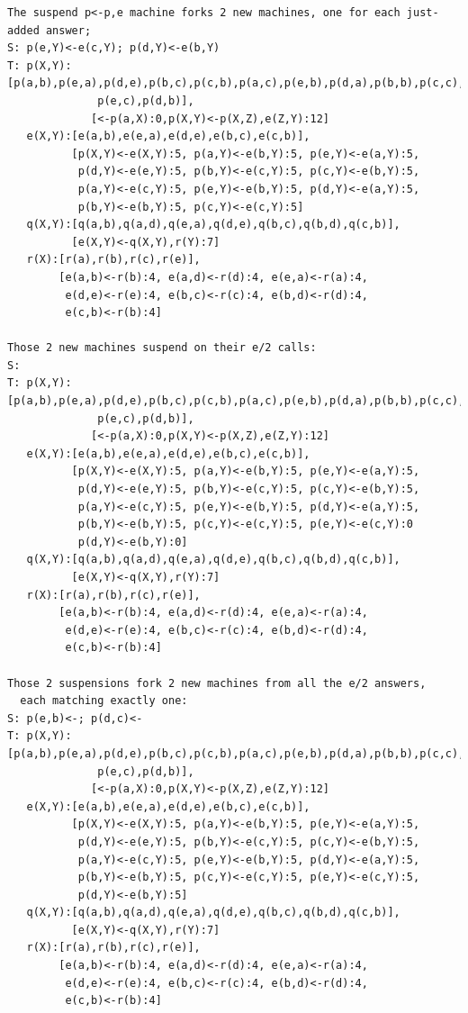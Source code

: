 \begin{verbatim}
The suspend p<-p,e machine forks 2 new machines, one for each just-added answer;
S: p(e,Y)<-e(c,Y); p(d,Y)<-e(b,Y)
T: p(X,Y):[p(a,b),p(e,a),p(d,e),p(b,c),p(c,b),p(a,c),p(e,b),p(d,a),p(b,b),p(c,c),
              p(e,c),p(d,b)],
             [<-p(a,X):0,p(X,Y)<-p(X,Z),e(Z,Y):12]
   e(X,Y):[e(a,b),e(e,a),e(d,e),e(b,c),e(c,b)],
          [p(X,Y)<-e(X,Y):5, p(a,Y)<-e(b,Y):5, p(e,Y)<-e(a,Y):5,
           p(d,Y)<-e(e,Y):5, p(b,Y)<-e(c,Y):5, p(c,Y)<-e(b,Y):5,
           p(a,Y)<-e(c,Y):5, p(e,Y)<-e(b,Y):5, p(d,Y)<-e(a,Y):5,
           p(b,Y)<-e(b,Y):5, p(c,Y)<-e(c,Y):5]
   q(X,Y):[q(a,b),q(a,d),q(e,a),q(d,e),q(b,c),q(b,d),q(c,b)],
          [e(X,Y)<-q(X,Y),r(Y):7]
   r(X):[r(a),r(b),r(c),r(e)],
        [e(a,b)<-r(b):4, e(a,d)<-r(d):4, e(e,a)<-r(a):4,
         e(d,e)<-r(e):4, e(b,c)<-r(c):4, e(b,d)<-r(d):4,
         e(c,b)<-r(b):4]

Those 2 new machines suspend on their e/2 calls:
S: 
T: p(X,Y):[p(a,b),p(e,a),p(d,e),p(b,c),p(c,b),p(a,c),p(e,b),p(d,a),p(b,b),p(c,c),
              p(e,c),p(d,b)],
             [<-p(a,X):0,p(X,Y)<-p(X,Z),e(Z,Y):12]
   e(X,Y):[e(a,b),e(e,a),e(d,e),e(b,c),e(c,b)],
          [p(X,Y)<-e(X,Y):5, p(a,Y)<-e(b,Y):5, p(e,Y)<-e(a,Y):5,
           p(d,Y)<-e(e,Y):5, p(b,Y)<-e(c,Y):5, p(c,Y)<-e(b,Y):5,
           p(a,Y)<-e(c,Y):5, p(e,Y)<-e(b,Y):5, p(d,Y)<-e(a,Y):5,
           p(b,Y)<-e(b,Y):5, p(c,Y)<-e(c,Y):5, p(e,Y)<-e(c,Y):0
           p(d,Y)<-e(b,Y):0]
   q(X,Y):[q(a,b),q(a,d),q(e,a),q(d,e),q(b,c),q(b,d),q(c,b)],
          [e(X,Y)<-q(X,Y),r(Y):7]
   r(X):[r(a),r(b),r(c),r(e)],
        [e(a,b)<-r(b):4, e(a,d)<-r(d):4, e(e,a)<-r(a):4,
         e(d,e)<-r(e):4, e(b,c)<-r(c):4, e(b,d)<-r(d):4,
         e(c,b)<-r(b):4]

Those 2 suspensions fork 2 new machines from all the e/2 answers,
  each matching exactly one:
S: p(e,b)<-; p(d,c)<-
T: p(X,Y):[p(a,b),p(e,a),p(d,e),p(b,c),p(c,b),p(a,c),p(e,b),p(d,a),p(b,b),p(c,c),
              p(e,c),p(d,b)],
             [<-p(a,X):0,p(X,Y)<-p(X,Z),e(Z,Y):12]
   e(X,Y):[e(a,b),e(e,a),e(d,e),e(b,c),e(c,b)],
          [p(X,Y)<-e(X,Y):5, p(a,Y)<-e(b,Y):5, p(e,Y)<-e(a,Y):5,
           p(d,Y)<-e(e,Y):5, p(b,Y)<-e(c,Y):5, p(c,Y)<-e(b,Y):5,
           p(a,Y)<-e(c,Y):5, p(e,Y)<-e(b,Y):5, p(d,Y)<-e(a,Y):5,
           p(b,Y)<-e(b,Y):5, p(c,Y)<-e(c,Y):5, p(e,Y)<-e(c,Y):5,
           p(d,Y)<-e(b,Y):5]
   q(X,Y):[q(a,b),q(a,d),q(e,a),q(d,e),q(b,c),q(b,d),q(c,b)],
          [e(X,Y)<-q(X,Y),r(Y):7]
   r(X):[r(a),r(b),r(c),r(e)],
        [e(a,b)<-r(b):4, e(a,d)<-r(d):4, e(e,a)<-r(a):4,
         e(d,e)<-r(e):4, e(b,c)<-r(c):4, e(b,d)<-r(d):4,
         e(c,b)<-r(b):4]


\end{verbatim}

